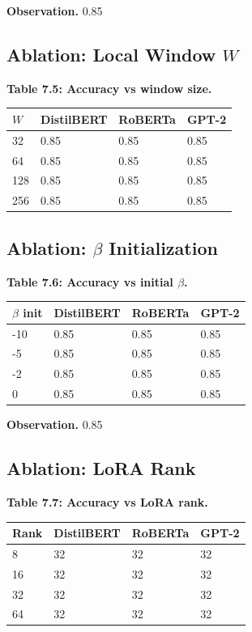 \textbf{Observation.} 0.85

\subsection{Ablation: Local Window $W$}

\textbf{Table 7.5: Accuracy vs window size.}

\begin{table}[H]
\centering
\small
\begin{tabular}{llll}
\toprule
\textbf{$W$} & \textbf{DistilBERT} & \textbf{RoBERTa} & \textbf{GPT-2} \\
\midrule
32 & 0.85 & 0.85 & 0.85 \\
64 & 0.85 & 0.85 & 0.85 \\
128 & 0.85 & 0.85 & 0.85 \\
256 & 0.85 & 0.85 & 0.85 \\
\bottomrule
\end{tabular}
\end{table}

\subsection{Ablation: $\beta$ Initialization}

\textbf{Table 7.6: Accuracy vs initial $\beta$.}

\begin{table}[H]
\centering
\small
\begin{tabular}{llll}
\toprule
\textbf{$\beta$ init} & \textbf{DistilBERT} & \textbf{RoBERTa} & \textbf{GPT-2} \\
\midrule
-10 & 0.85 & 0.85 & 0.85 \\
-5 & 0.85 & 0.85 & 0.85 \\
-2 & 0.85 & 0.85 & 0.85 \\
0 & 0.85 & 0.85 & 0.85 \\
\bottomrule
\end{tabular}
\end{table}

\textbf{Observation.} 0.85

\subsection{Ablation: LoRA Rank}

\textbf{Table 7.7: Accuracy vs LoRA rank.}

\begin{table}[H]
\centering
\small
\begin{tabular}{llll}
\toprule
\textbf{Rank} & \textbf{DistilBERT} & \textbf{RoBERTa} & \textbf{GPT-2} \\
\midrule
8 & 32 & 32 & 32 \\
16 & 32 & 32 & 32 \\
32 & 32 & 32 & 32 \\
64 & 32 & 32 & 32 \\
\bottomrule
\end{tabular}
\end{table}

